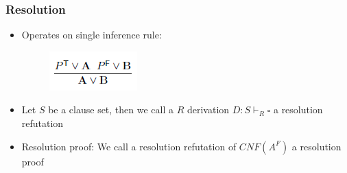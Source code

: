 \documentclass{scrartcl}
\begin{document}
\subsubsection{Resolution}
\begin{itemize}
    \item
        Operates on single inference rule:
\begin{figure}[H]
            \centering
            \includegraphics[scale=0.8]{figures/312}
\end{figure} 
    \item
        Let $S$ be a clause set, then we call a $R$ derivation $D: S \vdash_R \square$ a resolution refutation
    \item
        Resolution proof: We call a resolution refutation of $CNF(A^F)$ a resolution proof
\end{itemize}
\end{document}
